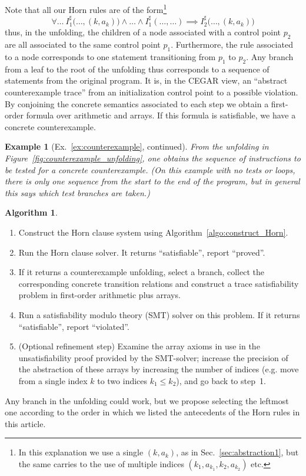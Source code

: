 \documentclass[a4paper]{article}
\newcommand{\abstr}[1]{#1^\sharp}
\theoremstyle{definition}
\newtheorem{algo}{Algorithm}
\theoremstyle{plain}
\newtheorem*{example*}{Example}
\begin{document}
Note that all our Horn rules are of the form\footnote{In this explanation we use a single $(k,a_k)$, as in Sec.~\ref{sec:abstraction1}, but the same carries to the use of multiple indices $(k_1,a_{k_1},k_2,a_{k_2})$ etc.}
\begin{equation}
\forall \dots~
  \abstr{I}_1\big(\dots, (k,a_k)\big) \land \dots \land \abstr{I}_1(\dots,\dots) \implies
  \abstr{I}_2\big(\dots, (k,a_k)\big) 
\end{equation}
thus, in the unfolding, the children of a node associated with a control point $p_2$ are all associated to the same control point $p_1$.
Furthermore, the rule associated to a node corresponds to one statement transitioning from $p_1$ to $p_2$.
Any branch from a leaf to the root of the unfolding thus corresponds to a sequence of statements from the original program.
It is, in the CEGAR view, an ``abstract counterexample trace'' from an initialization control point to a possible violation.
By conjoining the concrete semantics associated to each step we obtain a first-order formula over arithmetic and arrays.
If this formula is satisfiable, we have a concrete counterexample.

\begin{example*}[Ex.~\ref{ex:counterexample}, continued]
From the unfolding in Figure~\ref{fig:counterexample_unfolding}, one obtains the sequence of instructions to be tested for a concrete counterexample.
(On this example with no tests or loops, there is only one sequence from the start to the end of the program, but in general this says which test branches are taken.)
\end{example*}

\begin{algo}\label{algo:counterexample}
\begin{enumerate}
\item Construct the Horn clause system using Algorithm~\ref{algo:construct_Horn}.
\item Run the Horn clause solver. It returns ``satisfiable'', report ``proved''.
\item If it returns a counterexample unfolding, select a branch, collect the corresponding concrete transition relations and construct a trace satisfiability problem in first-order arithmetic plus arrays.
\item Run a satisfiability modulo theory (SMT) solver on this problem. If it returns ``satisfiable'', report ``violated''.
\item (Optional refinement step) Examine the array axioms in use in the unsatisfiability proof provided by the SMT-solver; increase the precision of the abstraction of these arrays by increasing the number of indices (e.g. move from a single index $k$ to two indices $k_1 \leq k_2$), and go back to step~1.
\end{enumerate}

Any branch in the unfolding could work, but we propose selecting the leftmost one according to the order in which we listed the antecedents of the Horn rules in this article.
\end{algo}
\end{document}
